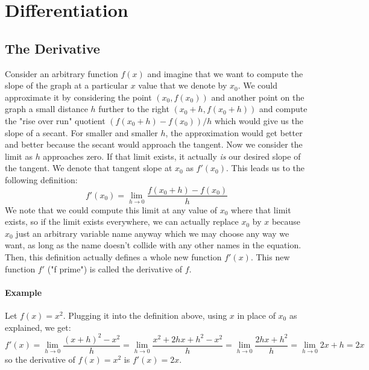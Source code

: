 \section{Differentiation}

\subsection{The Derivative}
Consider an arbitrary function $f(x)$ and imagine that we want to compute the slope of the graph at a particular $x$ value that we denote by $x_0$. We could approximate it by considering the point $(x_0, f(x_0))$ and another point on the graph a small distance $h$ further to the right $(x_0+h, f(x_0+h))$ and compute the "rise over run" quotient $(f(x_0+h) - f(x_0)) / h$ which would give us the slope of a secant. For smaller and smaller $h$, the approximation would get better and better because the secant would approach the tangent. Now we consider the limit as $h$ approaches zero. If that limit exists, it actually \emph{is} our desired slope of the tangent. We denote that tangent slope at $x_0$ as $f'(x_0)$. This leads us to the following definition:
\begin{equation}
\label{Eq:Derivative}
  f'(x_0) = \lim_{h \rightarrow 0} \frac{f(x_0 + h) - f(x_0)}{h}
\end{equation}
We note that we could compute this limit at any value of $x_0$ where that limit exists, so if the limit exists everywhere, we can actually replace $x_0$ by $x$ because $x_0$ just an arbitrary variable name anyway which we may choose any way we want, as long as the name doesn't collide with any other names in the equation. Then, this definition actually defines a whole new function $f'(x)$. This new function $f'$ ("f prime") is called the derivative of $f$.

\paragraph{Example} Let $f(x) = x^2$. Plugging it into the definition above, using $x$ in place of $x_0$ as explained, we get:
\begin{equation}
  f'(x) = \lim_{h \rightarrow 0} \frac{(x + h)^2 - x^2}{h}
        = \lim_{h \rightarrow 0} \frac{x^2 + 2 h x + h^2 - x^2}{h} 
        = \lim_{h \rightarrow 0} \frac{2 h x + h^2}{h} 
        = \lim_{h \rightarrow 0} 2 x + h
        = 2 x
\end{equation}
so the derivative of $f(x) = x^2$ is $f'(x) = 2 x$.

